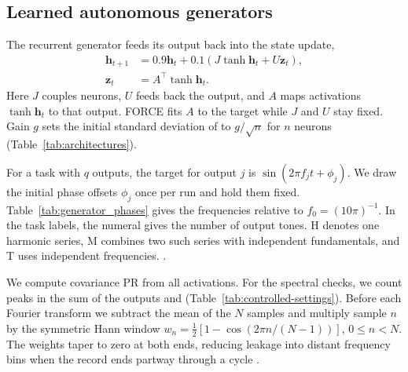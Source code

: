 {\subsection{Learned autonomous generators}
The recurrent generator feeds its output back into the state update,
\[
\begin{aligned}
\boldsymbol h_{t+1}&=0.9\boldsymbol h_t+
0.1(J\tanh\boldsymbol h_t+U\boldsymbol z_t),\\
\boldsymbol z_t&=A^\top\tanh\boldsymbol h_t.
\end{aligned}
\]
Here $J$ couples neurons, $U$ feeds back the output, and $A$ maps activations $\tanh\boldsymbol h_t$ to that output. FORCE fits $A$ to the target while $J$ and $U$ stay fixed. Gain $g$ sets the initial standard deviation of  to $g/\sqrt n$ for $n$ neurons (Table~\ref{tab:architectures}).

For a task with $q$ outputs, the target for output $j$ is $\sin(2\pi f_j t+\phi_j)$. We draw the initial phase offsets $\phi_j$ once per run and hold them fixed. Table~\ref{tab:generator_phases} gives the frequencies relative to $f_0=(10\pi)^{-1}$. In the task labels, the numeral gives the number of output tones. H denotes one harmonic series, M combines two such series with independent fundamentals, and T uses independent frequencies.  \citep{teschl2012ordinary}.

\begin{table}[htbp]
\centering\small
\caption{Phase structure in learned generators. Entries show mean $\pm$ standard deviation across five runs. We compute the MG estimate from the activation time series of one neuron and PR from . The MG estimate ranges from $5.00$ to $7.89$ for T3 and from $4.24$ to $6.29$ for T4.}
\label{tab:generator_phases}

\end{table}

 We compute covariance PR from all activations. For the spectral checks, we count peaks in the sum of the outputs and  (Table~\ref{tab:controlled-settings}). Before each Fourier transform we subtract the mean of the $N$ samples and multiply sample $n$ by the symmetric Hann window $w_n=\tfrac12[1-\cos(2\pi n/(N-1))]$, $0\le n<N$. The weights taper to zero at both ends, reducing leakage into distant frequency bins when the record ends partway through a cycle \citep{harris1978windows}.

}
